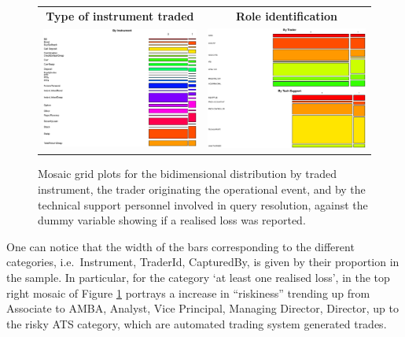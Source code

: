 \documentclass[]{article}
\begin{document}
\begin{figure}
\begin{frame}
      \centering
       \begin{tabular}{cc}
        \textbf{Type of instrument traded} & \textbf{Role identification} \\
        \includegraphics[width=7.5cm]{Single_Instr.eps}
         &
         \includegraphics[width=7.5cm]{Stacked_TrId_TechSup.eps}
         \end{tabular}
    \end{frame}
    \caption{Mosaic grid plots for the bidimensional distribution by traded instrument, the trader originating the operational event, and by the technical support personnel involved in query resolution, against the dummy variable showing if a realised loss was reported.}
    \label{Mosaic_Instr_Trd_Tec}
\end{figure}

One can notice that the width of the bars corresponding to the different
categories, i.e.~Instrument, TraderId, CapturedBy, is given by their
proportion in the sample. In particular, for the category `at least one
realised loss', in the top right mosaic of Figure
\ref{Mosaic_Instr_Trd_Tec} portrays a increase in ``riskiness'' trending
up from Associate to AMBA, Analyst, Vice Principal, Managing Director,
Director, up to the risky ATS category, which are automated trading
system generated trades.\medskip
\end{document}
